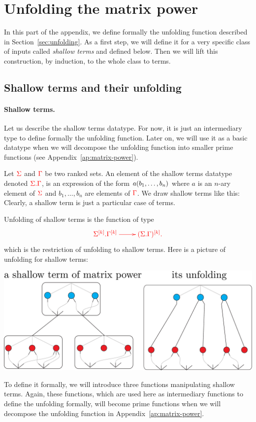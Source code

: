 \section{Unfolding the matrix power} 
\label{sec:appendix-unfold}
In this part of the appendix, we define formally the unfolding function described in Section~\ref{sec:unfolding}.
As a first step, we will define it for a very specific class of inputs called \emph{shallow terms} and defined below. Then we will lift this construction, by induction, to the whole class to terms.

\subsection{Shallow terms and their unfolding}\label{sec:shallow-terms}

\paragraph*{Shallow terms.} Let us describe the shallow terms datatype. For now, it is just an intermediary type to define formally the unfolding function. Later on, we will use it as a basic datatype when we will decompose the unfolding function into smaller prime functions (see Appendix~\ref{ap:matrix-power}). 

 Let ${\color{red}{\Sigma}}$ and ${\color{red}{\Gamma}}$ be two ranked sets. An element of the shallow terms datatype denoted ${\color{red}{{\color{red}{\Sigma}}. {\color{red}{\Gamma}}}}$, is an expression of the form $a(b_1,\dots,b_n)$ where $a$ is an $n$-ary element of ${\color{red}{\Sigma}}$ and $b_1,\dots, b_n$ are elements of ${\color{red}{\Gamma}}$. We draw shallow terms like this:
Clearly, a shallow term is just a particular case of terms.


Unfolding of shallow terms is the function of type 
\begin{align*}
    \ranked{
        \xymatrix{
            \shallowterm{\mati k \rSigma} {\mati k \rGamma}  \ar[r] & \mati k {(\shallowterm \Sigma \Gamma)}.
        }
    }
\end{align*}
which is the restriction of unfolding to shallow terms. Here is a picture of unfolding for shallow terms:
\begin{center}
\includegraphics[scale=.17]{pictures/shallow-term-unfold}
\end{center}
To define it formally, we will introduce three functions manipulating shallow terms. Again, these functions, which are used here as  intermediary functions to define the unfolding formally, will become prime functions when we will decompose the unfolding function in Appendix~\ref{ap:matrix-power}.

